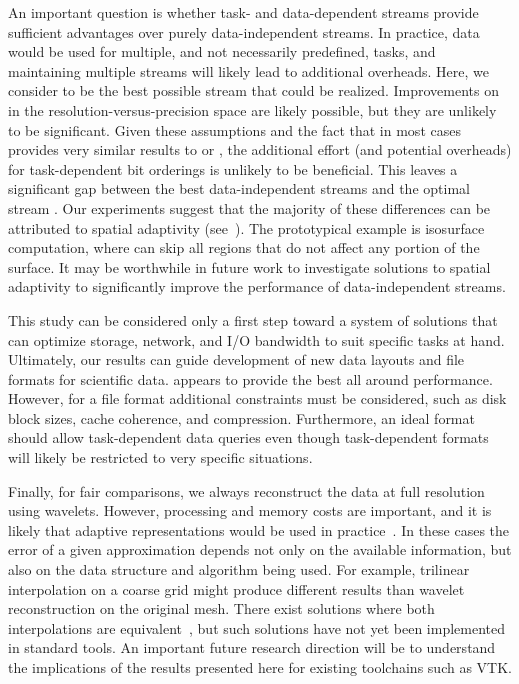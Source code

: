 An important question is whether task- and data-dependent streams provide sufficient advantages over
purely data-independent streams. In practice, data would be used for multiple, and not necessarily
predefined, tasks, and maintaining multiple streams will likely lead to additional overheads. Here,
we consider \ssig to be the best possible stream that could be realized. Improvements on \ssig in
the resolution-versus-precision space are likely possible, but they are unlikely to be significant.
Given these assumptions and the fact that \ssig in most cases provides very similar results to \sbit
or \swav, the additional effort (and potential overheads) for task-dependent bit orderings is
unlikely to be beneficial. This leaves a significant gap between the best data-independent streams
and the optimal stream \sopt. Our experiments suggest that the majority of these differences can be
attributed to spatial adaptivity (see~). The prototypical example is
isosurface computation, where \sopt can skip all regions that do not affect any portion of the
surface. It may be worthwhile in future work to investigate solutions to spatial adaptivity to
significantly improve the performance of data-independent streams.

This study can be considered only a first step toward a system of solutions that can optimize
storage, network, and I/O bandwidth to suit specific tasks at hand. Ultimately, our results can
guide development of new data layouts and file formats for scientific data. \swav appears to provide
the best all around performance. However, for a file format additional constraints must be
considered, such as disk block sizes, cache coherence, and compression. Furthermore, an ideal format
should allow task-dependent data queries even though task-dependent formats will likely be
restricted to very specific situations. 

Finally, for fair comparisons, we always reconstruct the data at full resolution using wavelets.
However, processing and memory costs are important, and it is likely that adaptive representations
would be used in practice~\cite{gigavoxels,Gobbetti2008,vdb2013}. In these cases the error of a
given approximation depends not only on the available information, but also on the data structure
and algorithm being used. For example, trilinear interpolation on a coarse grid might produce
different results than wavelet reconstruction on the original mesh. There exist solutions where both
interpolations are equivalent~\cite{weiss}, but such solutions have not yet been implemented in
standard tools. An important future research direction will be to understand the implications of the
results presented here for existing toolchains such as VTK.

